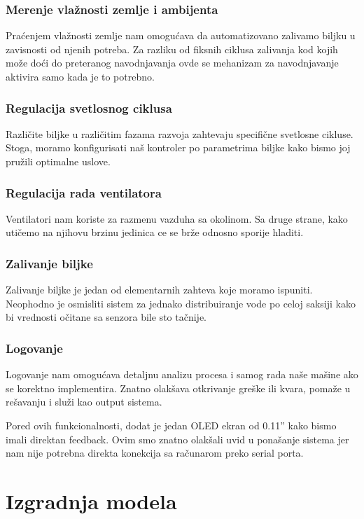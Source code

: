 \documentclass[a4paper,11pt]{book}
\begin{document}
\subsection{Merenje vlažnosti zemlje i ambijenta}
Praćenjem vlažnosti zemlje nam omogućava da automatizovano zalivamo biljku u zavisnosti od njenih potreba. Za razliku od fiksnih ciklusa zalivanja kod kojih može doći do preteranog navodnjavanja ovde se mehanizam za navodnjavanje aktivira samo kada je to potrebno.

\subsection{Regulacija svetlosnog ciklusa}
Različite biljke u različitim fazama razvoja zahtevaju specifične svetlosne cikluse. Stoga, moramo konfigurisati naš kontroler po parametrima biljke kako bismo joj pružili optimalne uslove.

\subsection{Regulacija rada ventilatora}
Ventilatori nam koriste za razmenu vazduha sa okolinom. Sa druge strane, kako utičemo na njihovu brzinu jedinica ce se brže odnosno sporije hladiti.

\subsection{Zalivanje biljke}
Zalivanje biljke je jedan od elementarnih zahteva koje moramo ispuniti. Neophodno je osmisliti sistem za jednako distribuiranje vode po celoj saksiji kako bi vrednosti očitane sa senzora bile sto tačnije.

\subsection{Logovanje}
Logovanje nam omogućava detaljnu analizu procesa i samog rada naše mašine ako se korektno implementira. Znatno olakšava otkrivanje greške ili kvara, pomaže u rešavanju i služi kao output sistema.


 
Pored ovih funkcionalnosti, dodat je jedan OLED ekran od 0.11'' kako bismo imali direktan feedback. Ovim smo znatno olakšali uvid u ponašanje sistema jer nam nije potrebna direkta konekcija sa računarom preko serial porta.

\chapter{Izgradnja modela}
\end{document}
